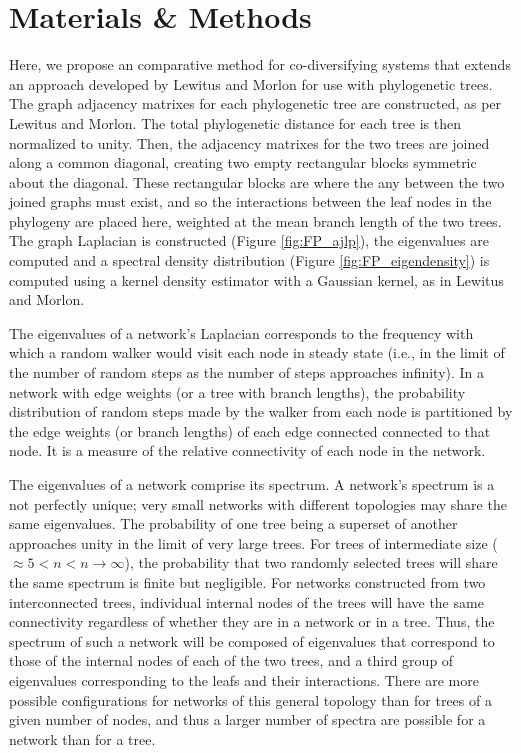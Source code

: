 \section{Materials \& Methods}

Here, we propose an comparative method for co-diversifying systems that extends an approach developed by Lewitus and Morlon \cite{lewitus2015characterizing} for use with phylogenetic trees. The graph adjacency matrixes for each phylogenetic tree are constructed, as per Lewitus and Morlon. The total phylogenetic distance for each tree is then normalized to unity. Then, the adjacency matrixes for the two trees are joined along a common diagonal, creating two empty rectangular blocks symmetric about the diagonal. These rectangular blocks are where the any between the two joined graphs must exist, and so the interactions between the leaf nodes in the phylogeny are placed here, weighted at the mean branch length of the two trees. The graph Laplacian is constructed (Figure \ref{fig:FP_ajlp}), the eigenvalues are computed and a spectral density distribution (Figure \ref{fig:FP_eigendensity}) is computed using a kernel density estimator with a Gaussian kernel, as in Lewitus and Morlon. 



The eigenvalues of a network's Laplacian corresponds to the frequency with which a random walker would visit each node in steady state (i.e., in the limit of the number of random steps as the number of steps approaches infinity). In a network with edge weights (or a tree with branch lengths), the probability distribution of random steps made by the walker from each node is partitioned by the edge weights (or branch lengths) of each edge connected connected to that node. It is a measure of the relative connectivity of each node in the network. 



The eigenvalues of a network comprise its spectrum. A network's spectrum is a not perfectly unique; very small networks with different topologies may share the same eigenvalues. The probability of one tree being a superset of another approaches unity in the limit of very large trees. For trees of intermediate size ($ \approx 5 < n < n \rightarrow \infty$), the probability that two randomly selected trees will share the same spectrum is finite but negligible. \cite{matsen2012ubiquity} For networks constructed from two interconnected trees, individual internal nodes of the trees will have the same connectivity regardless of whether they are in a network or in a tree. Thus, the spectrum of such a network will be composed of eigenvalues that correspond to those of the internal nodes of each of the two trees, and a third group of eigenvalues corresponding to the leafs and their interactions. There are more possible configurations for networks of this general topology than for trees of a given number of nodes, and thus a larger number of spectra are possible for a network than for a tree.

